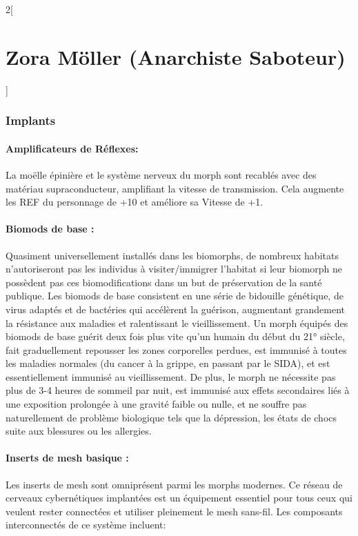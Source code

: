 \documentclass[a4paper,9pt]{article}
\begin{document}
\begin{multicols}{2}[\section*{Zora Möller (Anarchiste Saboteur)}]
   \subsubsection*{Implants}

   \paragraph{Amplificateurs de Réflexes:} La moëlle épinière et le système nerveux
   du morph sont recablés avec des matériau supraconducteur, amplifiant la
   vitesse de transmission. Cela augmente les REF du personnage de +10 et améliore
   sa Vitesse de +1.

   \paragraph{Biomods de base :} 
   Quasiment universellement  installés dans les biomorphs, de nombreux habitats
   n'autoriseront pas les individus à visiter/immigrer l'habitat si leur biomorph
   ne possèdent pas ces biomodifications dans un but de préservation de la santé
   publique. Les biomods de base consistent en une série de bidouille génétique,
   de virus adaptés et de bactéries qui accélèrent la guérison, augmentant
   grandement la résistance aux maladies et ralentissant le vieillissement. Un
   morph équipés des biomods de base guérit deux fois plus vite qu'un humain du
   début du 21° siècle, fait graduellement repousser les zones corporelles
   perdues, est immunisé à toutes les maladies normales (du cancer à la grippe, en
   passant par le SIDA), et est essentiellement immunisé au vieillissement. De
   plus, le morph ne nécessite pas plus de 3-4 heures de sommeil par nuit, est
   immunisé aux effets secondaires liés à une exposition prolongée à une gravité
   faible ou nulle, et ne souffre pas naturellement de problème biologique tels
   que la dépression, les états de chocs suite aux blessures ou les allergies.

   \paragraph{Inserts de mesh basique :} 
   Les inserts de mesh sont omniprésent parmi les morphs modernes. Ce réseau de
   cerveaux cybernétiques implantées est un équipement essentiel pour tous ceux
   qui veulent rester connectées et utiliser pleinement le mesh sans-fil. Les
   composants interconnectés de ce système incluent: 


\end{multicols}
\end{document}
